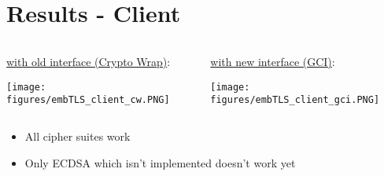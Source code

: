\section{Results - \embtls Client}

\begin{frame}

\begin{columns}

\begin{column}{0.5\textwidth}

\underline{with old interface (Crypto Wrap)}:

\texttt{[image: figures/embTLS\_client\_cw.PNG]}

\end{column}

\begin{column}{0.5\textwidth}

\underline{with new interface (GCI)}:

\texttt{[image: figures/embTLS\_client\_gci.PNG]}

\end{column}

\end{columns}

\begin{itemize}
  \item All cipher suites work
  \item Only ECDSA which isn't implemented doesn't work yet
\end{itemize}

\end{frame}
